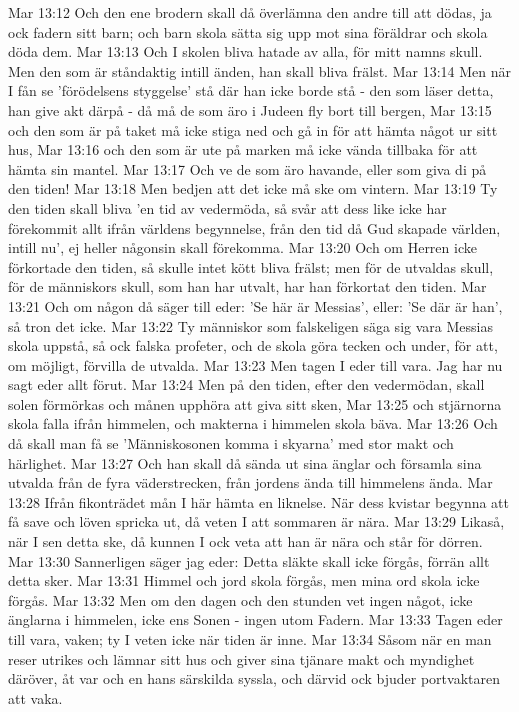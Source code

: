 Mar 13:12  Och den ene brodern skall då överlämna den andre till att dödas, ja ock fadern sitt barn; och barn skola sätta sig upp mot sina föräldrar och skola döda dem.
Mar 13:13  Och I skolen bliva hatade av alla, för mitt namns skull. Men den som är ståndaktig intill änden, han skall bliva frälst.
Mar 13:14  Men när I fån se 'förödelsens styggelse' stå där han icke borde stå - den som läser detta, han give akt därpå - då må de som äro i Judeen fly bort till bergen,
Mar 13:15  och den som är på taket må icke stiga ned och gå in för att hämta något ur sitt hus,
Mar 13:16  och den som är ute på marken må icke vända tillbaka för att hämta sin mantel.
Mar 13:17  Och ve de som äro havande, eller som giva di på den tiden!
Mar 13:18  Men bedjen att det icke må ske om vintern.
Mar 13:19  Ty den tiden skall bliva 'en tid av vedermöda, så svår att dess like icke har förekommit allt ifrån världens begynnelse, från den tid då Gud skapade världen, intill nu', ej heller någonsin skall förekomma.
Mar 13:20  Och om Herren icke förkortade den tiden, så skulle intet kött bliva frälst; men för de utvaldas skull, för de människors skull, som han har utvalt, har han förkortat den tiden.
Mar 13:21  Och om någon då säger till eder: 'Se här är Messias', eller: 'Se där är han', så tron det icke.
Mar 13:22  Ty människor som falskeligen säga sig vara Messias skola uppstå, så ock falska profeter, och de skola göra tecken och under, för att, om möjligt, förvilla de utvalda.
Mar 13:23  Men tagen I eder till vara. Jag har nu sagt eder allt förut.
Mar 13:24  Men på den tiden, efter den vedermödan, skall solen förmörkas och månen upphöra att giva sitt sken,
Mar 13:25  och stjärnorna skola falla ifrån himmelen, och makterna i himmelen skola bäva.
Mar 13:26  Och då skall man få se 'Människosonen komma i skyarna' med stor makt och härlighet.
Mar 13:27  Och han skall då sända ut sina änglar och församla sina utvalda från de fyra väderstrecken, från jordens ända till himmelens ända.
Mar 13:28  Ifrån fikonträdet mån I här hämta en liknelse. När dess kvistar begynna att få save och löven spricka ut, då veten I att sommaren är nära.
Mar 13:29  Likaså, när I sen detta ske, då kunnen I ock veta att han är nära och står för dörren.
Mar 13:30  Sannerligen säger jag eder: Detta släkte skall icke förgås, förrän allt detta sker.
Mar 13:31  Himmel och jord skola förgås, men mina ord skola icke förgås.
Mar 13:32  Men om den dagen och den stunden vet ingen något, icke änglarna i himmelen, icke ens Sonen - ingen utom Fadern.
Mar 13:33  Tagen eder till vara, vaken; ty I veten icke när tiden är inne.
Mar 13:34  Såsom när en man reser utrikes och lämnar sitt hus och giver sina tjänare makt och myndighet däröver, åt var och en hans särskilda syssla, och därvid ock bjuder portvaktaren att vaka.
